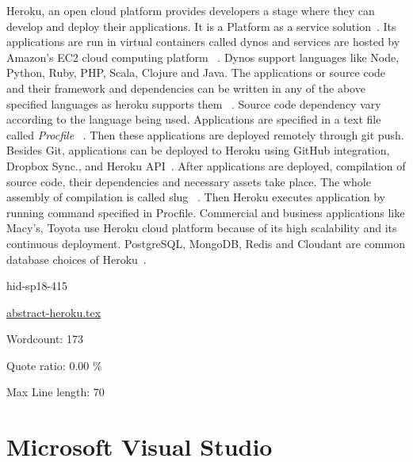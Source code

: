 Heroku, an open cloud platform provides developers a stage where they
can develop and deploy their applications. It is a Platform as a
service solution~\cite{hid-sp18-415-www-heroku}.  Its applications
are run in virtual containers called dynos and services are hosted by
Amazon's EC2 cloud computing platform
~\cite{hid-sp18-415-wiki-heroku}. Dynos support languages like Node,
Python, Ruby, PHP, Scala, Clojure and Java. The applications or source
code and their framework and dependencies can be written in any of the
above specified languages as heroku supports them
~\cite{hid-sp18-415-how-heroku-works}. Source code dependency vary
according to the language being used. Applications are specified in a
text file called \textit{Procfile}
~\cite{hid-sp18-415-how-heroku-works}. Then these applications are
deployed remotely through git push. Besides Git, applications can be
deployed to Heroku using GitHub integration, Dropbox Sync., and Heroku
API~\cite{hid-sp18-415-how-heroku-works}. After applications are
deployed, compilation of source code, their dependencies and necessary
assets take place. The whole assembly of compilation is called slug
~\cite{hid-sp18-415-how-heroku-works}.  Then Heroku executes
application by running command specified in Procfile.  Commercial and
business applications like Macy's, Toyota use Heroku cloud platform
because of its high scalability and its continuous
deployment. PostgreSQL, MongoDB, Redis and Cloudant are common
database choices of Heroku~\cite{hid-sp18-415-www-heroku}.


\begin{IU}

hid-sp18-415

\href{https://github.com/cloudmesh-community/hid-sp18-415/blob/master//technology/abstract-heroku.tex}{abstract-heroku.tex}

 

Wordcount: 173


Quote ratio: 0.00 \%
 
Max Line length: 70
\end{IU}

\section{Microsoft Visual Studio}


